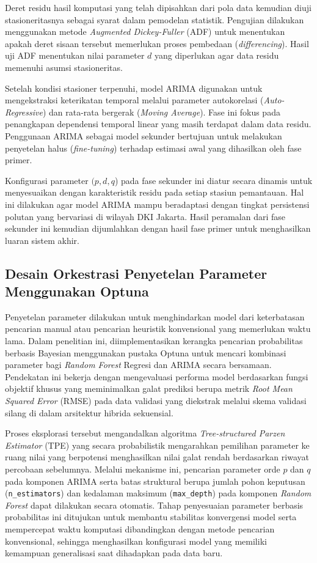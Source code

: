 Deret residu hasil komputasi yang telah dipisahkan dari pola data kemudian diuji stasioneritasnya sebagai syarat dalam pemodelan statistik. Pengujian dilakukan menggunakan metode \textit{Augmented Dickey-Fuller} (ADF) untuk menentukan apakah deret sisaan tersebut memerlukan proses pembedaan (\textit{differencing}). Hasil uji ADF menentukan nilai parameter $d$ yang diperlukan agar data residu memenuhi asumsi stasioneritas.

Setelah kondisi stasioner terpenuhi, model ARIMA digunakan untuk mengekstraksi keterikatan temporal melalui parameter autokorelasi (\textit{Auto-Regressive}) dan rata-rata bergerak (\textit{Moving Average}). Fase ini fokus pada penangkapan dependensi temporal linear yang masih terdapat dalam data residu. Penggunaan ARIMA sebagai model sekunder bertujuan untuk melakukan penyetelan halus (\textit{fine-tuning}) terhadap estimasi awal yang dihasilkan oleh fase primer.

Konfigurasi parameter $(p, d, q$) pada fase sekunder ini diatur secara dinamis untuk menyesuaikan dengan karakteristik residu pada setiap stasiun pemantauan. Hal ini dilakukan agar model ARIMA mampu beradaptasi dengan tingkat persistensi polutan yang bervariasi di wilayah DKI Jakarta. Hasil peramalan dari fase sekunder ini kemudian dijumlahkan dengan hasil fase primer untuk menghasilkan luaran sistem akhir.

\subsection{Desain Orkestrasi Penyetelan Parameter Menggunakan Optuna}

Penyetelan parameter dilakukan untuk menghindarkan model dari keterbatasan pencarian manual atau pencarian heuristik konvensional yang memerlukan waktu lama. Dalam penelitian ini, diimplementasikan kerangka pencarian probabilitas berbasis Bayesian menggunakan pustaka Optuna untuk mencari kombinasi parameter bagi \textit{Random Forest} Regresi dan ARIMA secara bersamaan. Pendekatan ini bekerja dengan mengevaluasi performa model berdasarkan fungsi objektif khusus yang meminimalkan galat prediksi berupa metrik \textit{Root Mean Squared Error} (RMSE) pada data validasi yang diekstrak melalui skema validasi silang di dalam arsitektur hibrida sekuensial.

Proses eksplorasi tersebut mengandalkan algoritma \textit{Tree-structured Parzen Estimator} (TPE) yang secara probabilistik mengarahkan pemilihan parameter ke ruang nilai yang berpotensi menghasilkan nilai galat rendah berdasarkan riwayat percobaan sebelumnya. Melalui mekanisme ini, pencarian parameter orde $p$ dan $q$ pada komponen ARIMA serta batas struktural berupa jumlah pohon keputusan (\texttt{n\_estimators}) dan kedalaman maksimum (\texttt{max\_depth}) pada komponen \textit{Random Forest} dapat dilakukan secara otomatis. Tahap penyesuaian parameter berbasis probabilitas ini ditujukan untuk membantu stabilitas konvergensi model serta mempercepat waktu komputasi dibandingkan dengan metode pencarian konvensional, sehingga menghasilkan konfigurasi model yang memiliki kemampuan generalisasi saat dihadapkan pada data baru.

